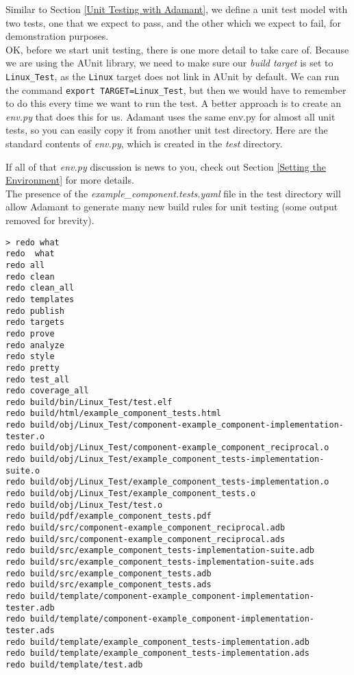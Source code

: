 Similar to Section \ref{Unit Testing with Adamant}, we define a unit test model with two tests, one that we expect to pass, and the other which we expect to fail, for demonstration purposes. \\

OK, before we start unit testing, there is one more detail to take care of. Because we are using the AUnit library, we need to make sure our \textit{build target} is set to \texttt{Linux\_Test}, as the \texttt{Linux} target does not link in AUnit by default. We can run the command \texttt{export TARGET=Linux\_Test}, but then we would have to remember to do this every time we want to run the test. A better approach is to create an \textit{env.py} that does this for us. Adamant uses the same env.py for almost all unit tests, so you can easily copy it from another unit test directory. Here are the standard contents of \textit{env.py}, which is created in the \textit{test} directory.


If all of that \textit{env.py} discussion is news to you, check out Section \ref{Setting the Environment} for more details. \\

The presence of the \textit{example\_component.tests.yaml} file in the test directory will allow Adamant to generate many new build rules for unit testing (some output removed for brevity). \\

\vspace{5mm} %
\begin{verbatim}
> redo what
redo  what
redo all
redo clean
redo clean_all
redo templates
redo publish
redo targets
redo prove
redo analyze
redo style
redo pretty
redo test_all
redo coverage_all
redo build/bin/Linux_Test/test.elf
redo build/html/example_component_tests.html
redo build/obj/Linux_Test/component-example_component-implementation-tester.o
redo build/obj/Linux_Test/component-example_component_reciprocal.o
redo build/obj/Linux_Test/example_component_tests-implementation-suite.o
redo build/obj/Linux_Test/example_component_tests-implementation.o
redo build/obj/Linux_Test/example_component_tests.o
redo build/obj/Linux_Test/test.o
redo build/pdf/example_component_tests.pdf
redo build/src/component-example_component_reciprocal.adb
redo build/src/component-example_component_reciprocal.ads
redo build/src/example_component_tests-implementation-suite.adb
redo build/src/example_component_tests-implementation-suite.ads
redo build/src/example_component_tests.adb
redo build/src/example_component_tests.ads
redo build/template/component-example_component-implementation-tester.adb
redo build/template/component-example_component-implementation-tester.ads
redo build/template/example_component_tests-implementation.adb
redo build/template/example_component_tests-implementation.ads
redo build/template/test.adb
\end{verbatim}
\vspace{5mm} %

